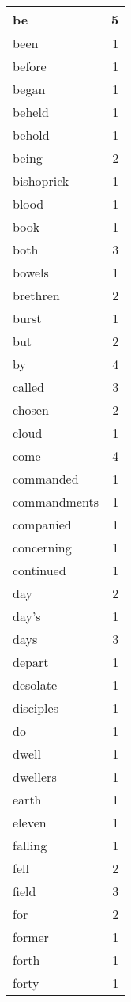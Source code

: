 \begin{center}
\begin{longtable}{l|r}
be & 5 \\ \hline
been & 1 \\ \hline
before & 1 \\ \hline
began & 1 \\ \hline
beheld & 1 \\ \hline
behold & 1 \\ \hline
being & 2 \\ \hline
bishoprick & 1 \\ \hline
blood & 1 \\ \hline
book & 1 \\ \hline
both & 3 \\ \hline
bowels & 1 \\ \hline
brethren & 2 \\ \hline
burst & 1 \\ \hline
but & 2 \\ \hline
by & 4 \\ \hline
called & 3 \\ \hline
chosen & 2 \\ \hline
cloud & 1 \\ \hline
come & 4 \\ \hline
commanded & 1 \\ \hline
commandments & 1 \\ \hline
companied & 1 \\ \hline
concerning & 1 \\ \hline
continued & 1 \\ \hline
day & 2 \\ \hline
day's & 1 \\ \hline
days & 3 \\ \hline
depart & 1 \\ \hline
desolate & 1 \\ \hline
disciples & 1 \\ \hline
do & 1 \\ \hline
dwell & 1 \\ \hline
dwellers & 1 \\ \hline
earth & 1 \\ \hline
eleven & 1 \\ \hline
falling & 1 \\ \hline
fell & 2 \\ \hline
field & 3 \\ \hline
for & 2 \\ \hline
former & 1 \\ \hline
forth & 1 \\ \hline
forty & 1 \\ \hline

\end{longtable}
\end{center}
